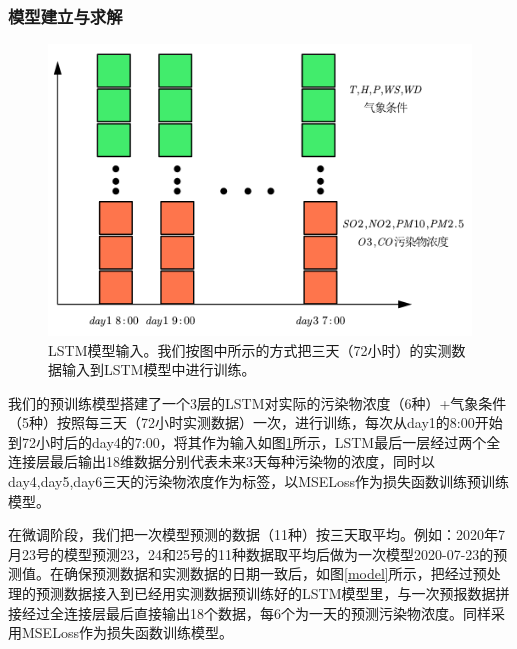 \documentclass[bwprint]{gmcmthesis}
\numberwithin{figure}{section}
\begin{document}
\subsubsection{模型建立与求解}
\begin{figure}[!h]
	\centering
	\includegraphics[width=.7\textwidth]{LSTM_input.png}
	\caption{LSTM模型输入。我们按图中所示的方式把三天（72小时）的实测数据输入到LSTM模型中进行训练。}
	\label{LSTM-INPUT}
\end{figure}
我们的预训练模型搭建了一个3层的LSTM对实际的污染物浓度（6种）+气象条件（5种）按照每三天（72小时实测数据）一次，进行训练，每次从day1的8:00开始到72小时后的day4的7:00，将其作为输入如图\ref{LSTM-INPUT}所示，LSTM最后一层经过两个全连接层最后输出18维数据分别代表未来3天每种污染物的浓度，同时以day4,day5,day6三天的污染物浓度作为标签，以MSELoss作为损失函数训练预训练模型。

在微调阶段，我们把一次模型预测的数据（11种）按三天取平均。例如：2020年7月23号的模型预测23，24和25号的11种数据取平均后做为一次模型2020-07-23的预测值。在确保预测数据和实测数据的日期一致后，如图\ref{model}所示，把经过预处理的预测数据接入到已经用实测数据预训练好的LSTM模型里，与一次预报数据拼接经过全连接层最后直接输出18个数据，每6个为一天的预测污染物浓度。同样采用MSELoss作为损失函数训练模型。
\end{document}
